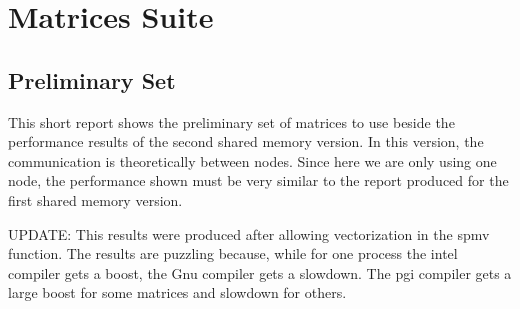 \section{Matrices Suite} \label{matricesSuite}





\subsection*{Preliminary Set}
This short report shows the preliminary set of matrices to use beside the performance results of the second shared memory version. In this version, the communication is theoretically between nodes. Since here we are only using one node, the performance shown must be very similar to the report produced for the first shared memory version.

UPDATE: This results were produced after allowing vectorization in the spmv function. The results are puzzling because, while for one process the intel compiler gets a boost, the Gnu compiler gets a slowdown. The pgi compiler gets a large boost for some matrices and slowdown for others.

\medskip

